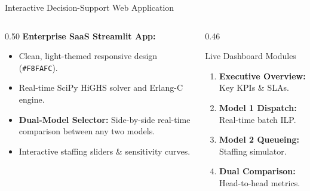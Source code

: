 \documentclass[10pt,aspectratio=169]{beamer}
\begin{document}
\begin{frame}{Interactive Decision-Support Web Application}
    \begin{columns}[c]
        \begin{column}{0.50\textwidth}
            \textbf{Enterprise SaaS Streamlit App:}
            \vspace{0.2cm}
            \begin{itemize}
                \setlength\itemsep{0.6em}
                \item Clean, light-themed responsive design (\texttt{\#F8FAFC}).
                \item Real-time SciPy HiGHS solver and Erlang-C engine.
                \item \textbf{Dual-Model Selector:} Side-by-side real-time comparison between any two models.
                \item Interactive staffing sliders \& sensitivity curves.
            \end{itemize}
        \end{column}
        \begin{column}{0.46\textwidth}
            \begin{block}{Live Dashboard Modules}
                \begin{enumerate}
                    \setlength\itemsep{0.4em}
                    \item \textbf{Executive Overview:} Key KPIs \& SLAs.
                    \item \textbf{Model 1 Dispatch:} Real-time batch ILP.
                    \item \textbf{Model 2 Queueing:} Staffing simulator.
                    \item \textbf{Dual Comparison:} Head-to-head metrics.
                \end{enumerate}
            \end{block}
        \end{column}
    \end{columns}
\end{frame}
\end{document}
